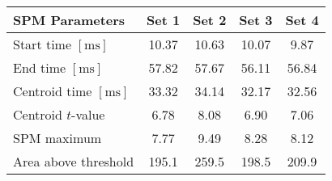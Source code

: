 \begin{tabular}{|l|c|c|c|c|}
    \hline {\rule{0pt}{2.0ex}} \hspace{-7pt}
    SPM Parameters & Set 1 & Set 2 & Set 3 & Set 4\\
    \hline
    \hline {\rule{0pt}{2.0ex}} \hspace{-7pt}
    Start time $ [\si{\milli \second}] $ & 10.37 & 10.63 & 10.07 & 9.87\\[0.3ex]
    End time $ [\si{\milli \second}] $ & 57.82 & 57.67 & 56.11 & 56.84\\[0.3ex]
    Centroid time $ [\si{\milli \second}] $ & 33.32 & 34.14 & 32.17 & 32.56\\[0.3ex]
    Centroid $ t $-value & 6.78 & 8.08 & 6.90 & 7.06\\[0.3ex]
    SPM maximum & 7.77 & 9.49 & 8.28 & 8.12\\[0.3ex]
    Area above threshold & 195.1 & 259.5 & 198.5 & 209.9\\[0.3ex]
    \hline
\end{tabular}
